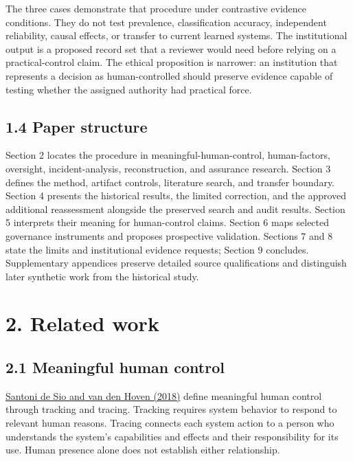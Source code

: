 \documentclass[11pt]{article}
\begin{document}
The three cases demonstrate that procedure under contrastive evidence conditions. They do not test prevalence, classification accuracy, independent reliability, causal effects, or transfer to current learned systems. The institutional output is a proposed record set that a reviewer would need before relying on a practical-control claim. The ethical proposition is narrower: an institution that represents a decision as human-controlled should preserve evidence capable of testing whether the assigned authority had practical force.

\subsection*{1.4 Paper structure}

Section 2 locates the procedure in meaningful-human-control, human-factors, oversight, incident-analysis, reconstruction, and assurance research. Section 3 defines the method, artifact controls, literature search, and transfer boundary. Section 4 presents the historical results, the limited correction, and the approved additional reassessment alongside the preserved search and audit results. Section 5 interprets their meaning for human-control claims. Section 6 maps selected governance instruments and proposes prospective validation. Sections 7 and 8 state the limits and institutional evidence requests; Section 9 concludes. Supplementary appendices preserve detailed source qualifications and distinguish later synthetic work from the historical study.

\section*{2. Related work}

\subsection*{2.1 Meaningful human control}

\href{https://doi.org/10.3389/frobt.2018.00015}{Santoni de Sio and van den Hoven (2018)} define meaningful human control through tracking and tracing. Tracking requires system behavior to respond to relevant human reasons. Tracing connects each system action to a person who understands the system's capabilities and effects and their responsibility for its use. Human presence alone does not establish either relationship.
\end{document}
